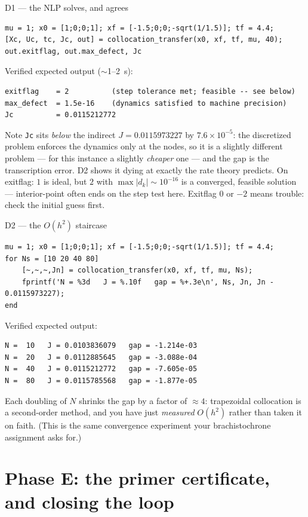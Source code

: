 \documentclass[11pt,letterpaper]{article}
\begin{document}
\begin{checkpoint}{D1 --- the NLP solves, and agrees}
\begin{verbatim}
mu = 1; x0 = [1;0;0;1]; xf = [-1.5;0;0;-sqrt(1/1.5)]; tf = 4.4;
[Xc, Uc, tc, Jc, out] = collocation_transfer(x0, xf, tf, mu, 40);
out.exitflag, out.max_defect, Jc
\end{verbatim}
Verified expected output ($\sim$1--2~s):
\begin{verbatim}
exitflag    = 2          (step tolerance met; feasible -- see below)
max_defect  = 1.5e-16    (dynamics satisfied to machine precision)
Jc          = 0.0115212772
\end{verbatim}
Note \texttt{Jc} sits \emph{below} the indirect $J = 0.0115973227$ by
$7.6\times 10^{-5}$: the discretized problem enforces the dynamics only at
the nodes, so it is a slightly different problem --- for this instance a
slightly \emph{cheaper} one --- and the gap is the transcription error. D2
shows it dying at exactly the rate theory predicts. On exitflag: $1$ is ideal, but $2$ with
$\max|d_k| \sim 10^{-16}$ is a converged, feasible solution ---
interior-point often ends on the step test here. Exitflag $0$ or $-2$ means
trouble: check the initial guess first.
\end{checkpoint}

\begin{checkpoint}{D2 --- the $O(h^2)$ staircase}
\begin{verbatim}
mu = 1; x0 = [1;0;0;1]; xf = [-1.5;0;0;-sqrt(1/1.5)]; tf = 4.4;
for Ns = [10 20 40 80]
    [~,~,~,Jn] = collocation_transfer(x0, xf, tf, mu, Ns);
    fprintf('N = %3d   J = %.10f   gap = %+.3e\n', Ns, Jn, Jn - 0.0115973227);
end
\end{verbatim}
Verified expected output:
\begin{verbatim}
N =  10   J = 0.0103836079   gap = -1.214e-03
N =  20   J = 0.0112885645   gap = -3.088e-04
N =  40   J = 0.0115212772   gap = -7.605e-05
N =  80   J = 0.0115785568   gap = -1.877e-05
\end{verbatim}
Each doubling of $N$ shrinks the gap by a factor of $\approx 4$: trapezoidal
collocation is a second-order method, and you have just \emph{measured}
$O(h^2)$ rather than taken it on faith. (This is the same convergence
experiment your brachistochrone assignment asks for.)
\end{checkpoint}

\section{Phase E: the primer certificate, and closing the loop}
\end{document}

